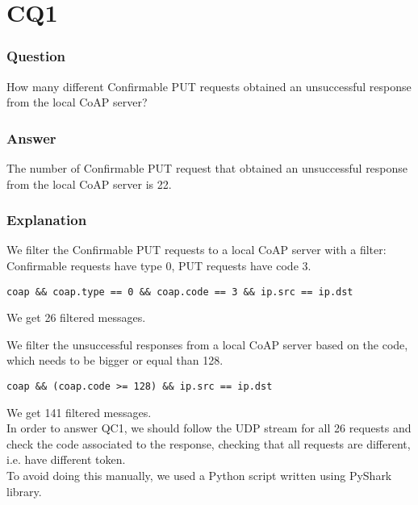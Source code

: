 \section{CQ1}
\subsubsection{Question}
How many different Confirmable PUT requests obtained an unsuccessful response from the local CoAP server?

\subsubsection{Answer}
The number of Confirmable PUT request that obtained an unsuccessful response from the local CoAP server is 22.

\subsubsection{Explanation}
We filter the Confirmable PUT requests to a local CoAP server with a filter: Confirmable requests have type 0, PUT requests have code 3.
\begin{verbatim}
coap && coap.type == 0 && coap.code == 3 && ip.src == ip.dst
\end{verbatim}
We get 26 filtered messages.

We filter the unsuccessful responses from a local CoAP server based on the code, which needs to be bigger or equal than 128.
\begin{verbatim}
coap && (coap.code >= 128) && ip.src == ip.dst
\end{verbatim}
We get 141 filtered messages.\\
In order to answer QC1, we should follow the UDP stream for all 26 requests and check the code associated to the response, checking that all requests are different, i.e. have different token.\\
To avoid doing this manually, we used a Python script written using PyShark library.

